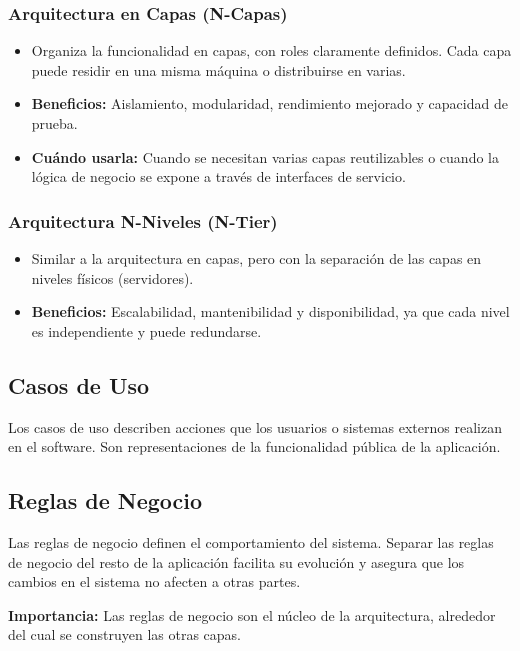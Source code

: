 \begin{center}
        \subsubsection{Arquitectura en Capas (N-Capas)}
            \begin{itemize}
                \item Organiza la funcionalidad en capas, con roles claramente definidos. 
                Cada capa puede residir en una misma máquina o distribuirse en varias.
                \item \textbf{Beneficios:} Aislamiento, modularidad, rendimiento mejorado y capacidad de prueba.
                \item \textbf{Cuándo usarla:} Cuando se necesitan varias capas reutilizables o cuando la lógica de negocio 
                se expone a través de interfaces de servicio.
            \end{itemize}
        \subsubsection{Arquitectura N-Niveles (N-Tier)}
            \begin{itemize}
                \item Similar a la arquitectura en capas, pero con la separación de las capas en niveles físicos (servidores).
                \item \textbf{Beneficios:} Escalabilidad, mantenibilidad y disponibilidad, ya que cada nivel es independiente 
                y puede redundarse.
            \end{itemize}
    \subsection{Casos de Uso}
    Los casos de uso describen acciones que los usuarios o sistemas externos realizan en el software. 
    Son representaciones de la funcionalidad pública de la aplicación.

    \subsection{Reglas de Negocio}
    Las reglas de negocio definen el comportamiento del sistema. Separar las reglas de negocio del 
    resto de la aplicación facilita su evolución y asegura que los cambios en el sistema no afecten a otras partes.

    \textbf{Importancia:} Las reglas de negocio son el núcleo de la arquitectura, alrededor del cual se construyen las otras capas.


\end{center}
